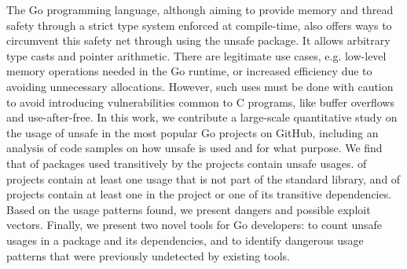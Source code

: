 The Go programming language, although aiming to provide memory and thread safety through a strict type system enforced at compile-time, also offers ways to circumvent this safety net through using the unsafe package.
It allows arbitrary type casts and pointer arithmetic.
There are legitimate use cases, e.g. low-level memory operations needed in the Go runtime, or increased efficiency due
to avoiding unnecessary allocations.
However, such uses must be done with caution to avoid introducing vulnerabilities common to C programs, like buffer
overflows and use-after-free.
In this work, we contribute a large-scale quantitative study on the usage of unsafe in the \projsAnalyzed{} most popular Go projects on GitHub, including an analysis of  code samples on how unsafe is used and for
what purpose.
We find that  of packages used transitively by the projects contain unsafe usages. 
of projects contain at least one usage that is not part of the standard library, and  of projects
contain at least one \unsafe{} in the project or one of its transitive dependencies.
Based on the usage patterns found, we present dangers and possible exploit vectors.
Finally, we present two novel tools for Go developers: \toolUsage{} to count unsafe usages in a package and its
dependencies, and \toolSA{} to identify dangerous usage patterns that were previously undetected by existing tools.
